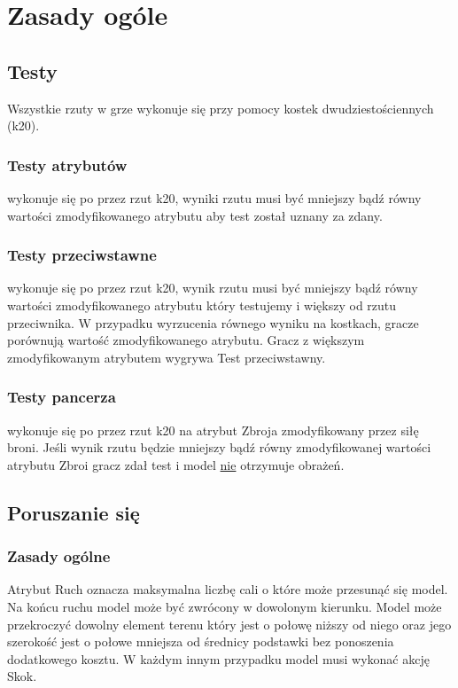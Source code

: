 \chapter{Zasady ogóle}

\section{Testy}

Wszystkie rzuty w grze wykonuje się przy pomocy kostek dwudziestościennych (k20).

\subsection{Testy atrybutów} wykonuje się po przez rzut k20, wyniki rzutu musi być mniejszy bądź równy wartości zmodyfikowanego atrybutu aby test został uznany za zdany. 

\subsection{Testy przeciwstawne} wykonuje się po przez rzut k20, wynik rzutu musi być mniejszy bądź równy wartości zmodyfikowanego atrybutu który testujemy i większy od rzutu przeciwnika. W przypadku wyrzucenia równego wyniku na kostkach, gracze porównują wartość zmodyfikowanego atrybutu. Gracz z większym zmodyfikowanym atrybutem wygrywa Test przeciwstawny. 
\subsection{Testy pancerza} wykonuje się po przez rzut k20 na atrybut Zbroja zmodyfikowany przez siłę broni. Jeśli wynik rzutu będzie mniejszy bądź równy zmodyfikowanej wartości atrybutu Zbroi gracz zdał test i model \underline{nie} otrzymuje obrażeń.


\section{Poruszanie się}
\subsection{Zasady ogólne}
Atrybut Ruch oznacza maksymalna liczbę cali o które może przesunąć się model. Na końcu ruchu model może być zwrócony w dowolonym kierunku. Model może przekroczyć dowolny element terenu który jest o połowę niższy od niego oraz jego szerokość jest o połowe mniejsza od średnicy podstawki bez ponoszenia dodatkowego kosztu. W każdym innym przypadku model musi wykonać akcję Skok. 
